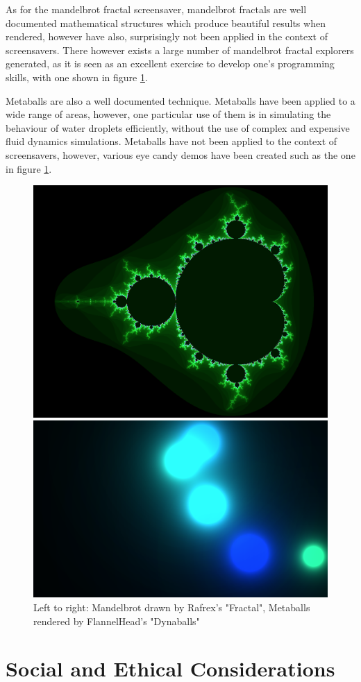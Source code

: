 \documentclass[10pt, openany]{book}
\begin{document}
As for the mandelbrot fractal screensaver, mandelbrot fractals are well documented mathematical structures which produce beautiful results when rendered, however have also, surprisingly not been applied in the context of screensavers. There however exists a large number of mandelbrot fractal explorers generated, as it is seen as an excellent exercise to develop one’s programming skills, with one shown in figure \ref{fig:products}.

Metaballs are also a well documented technique. Metaballs have been applied to a wide range of areas, however, one particular use of them is in simulating the behaviour of water droplets efficiently, without the use of complex and expensive fluid dynamics simulations. Metaballs have not been applied to the context of screensavers, however, various eye candy demos have been created such as the one in figure \ref{fig:products}.

\begin{figure}[H]
\centering
\begin{minipage}{.5\textwidth}
  \centering
  \includegraphics[width=.4\linewidth]{rafrex}  
\end{minipage}%
\begin{minipage}{.5\textwidth}
  \centering
  \includegraphics[width=.4\linewidth]{dynaballs} 
\end{minipage}
\caption[Examples of mandelbrot and metaballs products]{Left to right: Mandelbrot drawn by Rafrex's "Fractal", Metaballs rendered by FlannelHead's "Dynaballs"}
\label{fig:products}
\end{figure}	

\section{Social and Ethical Considerations}
\end{document}

